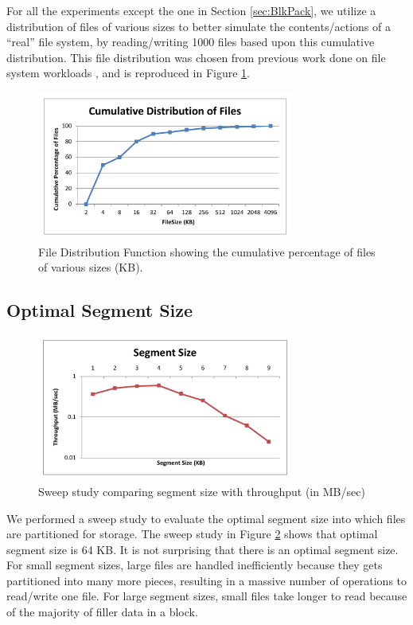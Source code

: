 \documentclass[conference]{IEEEtran}
\begin{document}
For all the experiments except the one in Section \ref{sec:BlkPack}, we utilize a distribution of files of various sizes to better simulate the contents/actions of a “real” file system, by reading/writing 1000 files based upon this cumulative distribution. This file distribution was chosen from previous work done on file system workloads \cite{roselli2000comparison}, and is reproduced in Figure \ref{fig:distfun}.

\begin{figure}
\begin{center}
\noindent\includegraphics[width=8.5cm]{510.pdf}
\caption{File Distribution Function showing the cumulative percentage of files of various sizes (KB).}
\label{fig:distfun}
\end{center}
\end{figure}

\subsection{Optimal Segment Size}
\begin{figure}
\begin{center}
\noindent\includegraphics[width=8.5cm]{520.pdf}
\caption{Sweep study comparing segment size with throughput (in MB/sec)}
\label{fig:segsize}
\end{center}
\end{figure}

We performed a sweep study to evaluate the optimal segment size into which files are partitioned for storage. The sweep study in Figure \ref{fig:segsize} shows that optimal segment size is 64 KB. It is not surprising that there is an optimal segment size. For small segment sizes, large files are handled inefficiently because they gets partitioned into many more pieces, resulting in a massive number of operations to read/write one file. For large segment sizes, small files take longer to read because of the majority of filler data in a block.
\end{document}

